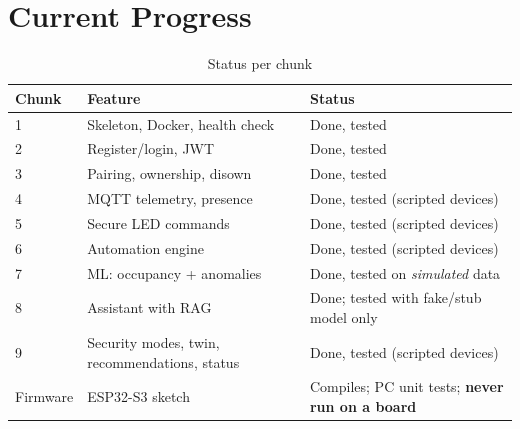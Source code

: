 \documentclass[11pt,a4paper]{article}
\begin{document}
\section{Current Progress}
\begin{table}[H]
\centering
\caption{Status per chunk}
\begin{tabularx}{\textwidth}{lXl}
\toprule
\textbf{Chunk} & \textbf{Feature} & \textbf{Status}\\
\midrule
1 & Skeleton, Docker, health check & Done, tested\\
2 & Register/login, JWT & Done, tested\\
3 & Pairing, ownership, disown & Done, tested\\
4 & MQTT telemetry, presence & Done, tested (scripted devices)\\
5 & Secure LED commands & Done, tested (scripted devices)\\
6 & Automation engine & Done, tested (scripted devices)\\
7 & ML: occupancy + anomalies & Done, tested on \emph{simulated} data\\
8 & Assistant with RAG & Done; tested with fake/stub model only\\
9 & Security modes, twin, recommendations, status & Done, tested (scripted devices)\\
Firmware & ESP32-S3 sketch & Compiles; PC unit tests; \textbf{never run on a board}\\
\bottomrule
\end{tabularx}
\end{table}

\end{document}
